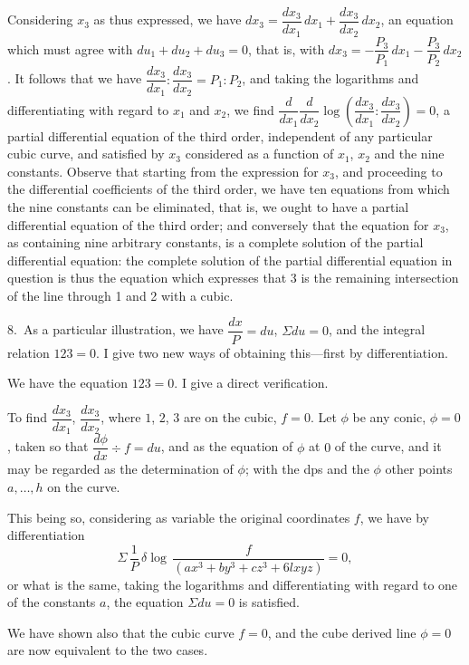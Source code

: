 \documentclass[11pt,a4paper]{article}
\theoremstyle{plain}
\theoremstyle{definition}
\theoremstyle{remark}
\begin{document}
Considering $x_3$ as thus expressed, we have $dx_3 = \dfrac{dx_3}{dx_1}\,dx_1 + \dfrac{dx_3}{dx_2}\,dx_2$, an equation which must agree with $du_1 + du_2 + du_3 = 0$, that is, with $dx_3 = -\dfrac{P_3}{P_1}\,dx_1 - \dfrac{P_3}{P_2}\,dx_2$. It follows that we have $\dfrac{dx_3}{dx_1} : \dfrac{dx_3}{dx_2} = P_1 : P_2$, and taking the logarithms and differentiating with regard to $x_1$ and $x_2$, we find $\dfrac{d}{dx_1}\dfrac{d}{dx_2}\log\left(\dfrac{dx_3}{dx_1} : \dfrac{dx_3}{dx_2}\right) = 0$, a partial differential equation of the third order, independent of any particular cubic curve, and satisfied by $x_3$ considered as a function of $x_1$, $x_2$ and the nine constants. Observe that starting from the expression for $x_3$, and proceeding to the differential coefficients of the third order, we have ten equations from which the nine constants can be eliminated, that is, we ought to have a partial differential equation of the third order; and conversely that the equation for $x_3$, as containing nine arbitrary constants, is a complete solution of the partial differential equation: the complete solution of the partial differential equation in question is thus the equation which expresses that 3 is the remaining intersection of the line through 1 and 2 with a cubic.

8.\ As a particular illustration, we have $\dfrac{dx}{P} = du$, $\Sigma du = 0$, and the integral relation $123 = 0$. I give two new ways of obtaining this---first by differentiation.

We have the equation $123 = 0$. I give a direct verification.

To find $\dfrac{dx_3}{dx_1}$, $\dfrac{dx_3}{dx_2}$, where $1$, $2$, $3$ are on the cubic, $f = 0$. Let $\phi$ be any conic, $\phi = 0$, taken so that $\dfrac{d\phi}{dx} \div f = du$, and as the equation of $\phi$ at $0$ of the curve, and it may be regarded as the determination of $\phi$; with the dps and the $\phi$ other points $a,\ldots,h$ on the curve.

This being so, considering as variable the original coordinates $f$, we have by differentiation
\[
\Sigma\,\frac{1}{P}\,\delta\log\,\frac{f}{(ax^3 + by^3 + cz^3 + 6lxyz)} = 0,
\]
or what is the same, taking the logarithms and differentiating with regard to one of the constants $a$, the equation $\Sigma du = 0$ is satisfied.

We have shown also that the cubic curve $f = 0$, and the cube derived line $\phi = 0$ are now equivalent to the two cases.

\bigskip
\end{document}
